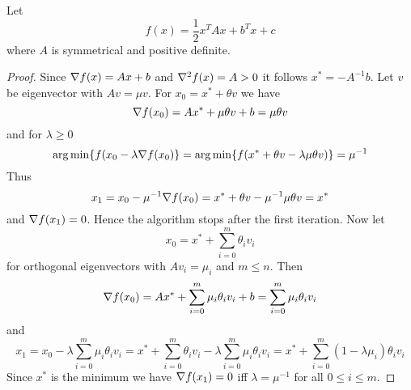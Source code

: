 \begin{exercise}
Let 
\[
       f(x) = \frac{1}{2} x^T{A}x + b^T x + c
\]
where \( A \) is symmetrical and positive definite. 
\end{exercise}

\begin{proof}
Since \( \nabla {f(x)} = Ax + b \) and \( \nabla^2 {f(x)} = A > 0 \) it follows \( x^* = -A^{-1}b \).
Let \( v \) be eigenvector with \( Av = \mu v \). For \( x_0 = x^* + \theta v \) we have
\[ 
    \nabla {f(x_0)} = Ax^* + \mu \theta v + b = \mu \theta v 
\] 
and for \(\lambda \ge 0 \)
\[
        \operatorname*{arg\,min} \{ f(x_0 - \lambda \nabla f(x_0) \} =\operatorname*{arg\,min} \{ f(x^* + \theta v - \lambda \mu \theta v)\} = \mu^{-1} 
\]
Thus         
\[
    x_1 = x_0 - \mu^{-1} \nabla f(x_0) = x^* + \theta v - \mu^{-1} \mu \theta v = x^*
\]
and \( \nabla {f(x_1)} = 0 \). Hence the algorithm stops after the first iteration.
Now let 
\[
    x_0 = x^* + \sum_{i=0}^m \theta_i v_i
\]
for orthogonal eigenvectors with \( Av_i = \mu_i\) and \( m \le n \). Then
\[ 
    \nabla {f(x_0)} = Ax^* + \sum_{i=0}^m \mu_i \theta_i v_i + b = \sum_{i=0}^m \mu_i \theta_i v_i
\]
and
\[ 
    x_1 = x_0 - \lambda \sum_{i=0}^m \mu_i \theta_i v_i 
        = x^* + \sum_{i=0}^m \theta_i v_i - \lambda \sum_{i=0}^m \mu_i \theta_i v_i
        = x^* + \sum_{i=0}^m (1 - \lambda \mu_i) \theta_i v_i
\]
Since \( x^* \) is the minimum we have \( \nabla {f(x_1)} = 0 \) iff \( \lambda = \mu^{-1} \) for all \( 0 \le i \le m \).
\end{proof}
\bigskip
